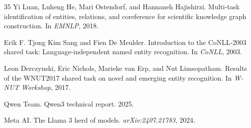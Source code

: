 \documentclass[11pt]{article}
\begin{document}
\begin{thebibliography}{35}
Yi Luan, Luheng He, Mari Ostendorf, and Hannaneh Hajishirzi.
Multi-task identification of entities, relations, and coreference for scientific knowledge graph construction.
In \emph{EMNLP}, 2018.

Erik F. Tjong Kim Sang and Fien De Meulder.
Introduction to the {CoNLL}-2003 shared task: Language-independent named entity recognition.
In \emph{CoNLL}, 2003.

Leon Derczynski, Eric Nichols, Marieke van Erp, and Nut Limsopatham.
Results of the {WNUT}2017 shared task on novel and emerging entity recognition.
In \emph{W-NUT Workshop}, 2017.

Qwen Team.
Qwen3 technical report.
2025.

Meta AI.
The {L}lama 3 herd of models.
\emph{arXiv:2407.21783}, 2024.

\end{thebibliography}
\end{document}

